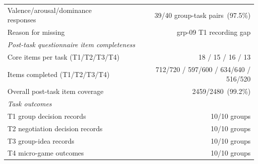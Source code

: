 \begin{table}[t]
\begin{tabular}{lr}
    \midrule
    Valence/arousal/dominance responses                 & 39/40 group-task pairs~(97.5\%) \\
    \quad Reason for missing                            & grp-09 T1 recording gap \\
    \midrule
    \multicolumn{2}{l}{\textit{Post-task questionnaire item completeness}} \\
    \midrule
    Core items per task (T1/T2/T3/T4)                   & 18 / 15 / 16 / 13 \\
    Items completed (T1/T2/T3/T4)                       & 712/720 / 597/600 / 634/640 / 516/520 \\
    Overall post-task item coverage                     & 2459/2480~(99.2\%) \\
    \midrule
    \multicolumn{2}{l}{\textit{Task outcomes}} \\
    \midrule
    T1 group decision records                           & 10/10 groups \\
    T2 negotiation decision records                     & 10/10 groups \\
    T3 group-idea records                               & 10/10 groups \\
    T4 micro-game outcomes                              & 10/10 groups \\
    \bottomrule
  \end{tabular}
\end{table}
